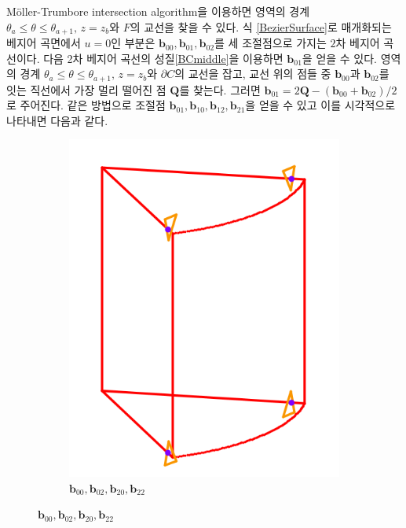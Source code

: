 \documentclass{gshs_thesis}
\theoremstyle{theorem}
\theoremstyle{lemma}
\theoremstyle{definition}
\begin{document}
Möller-Trumbore intersection algorithm을 이용하면 영역의 경계 $\theta_a \leq \theta \leq \theta_{a+1}, \, z = z_b$와 $F$의 교선을 찾을 수 있다. 식 \eqref{BezierSurface}로 매개화되는 베지어 곡면에서 $u = 0$인 부분은 $\mathbf{b}_{00}, \mathbf{b}_{01}, \mathbf{b}_{02}$를 세 조절점으로 가지는 $2$차 베지어 곡선이다. 다음 2차 베지어 곡선의 성질\eqref{BCmiddle}을 이용하면 $\mathbf{b}_{01}$을 얻을 수 있다. 영역의 경계 $\theta_a \leq \theta \leq \theta_{a+1}, \, z = z_b$와 $\partial C$의 교선을 잡고, 교선 위의 점들 중 $\mathbf{b}_{00}$과 $\mathbf{b}_{02}$를 잇는 직선에서 가장 멀리 떨어진 점 $\mathbf{Q}$를 찾는다. 그러면 $\mathbf{b}_{01} = 2\mathbf{Q} - (\mathbf{b}_{00} + \mathbf{b}_{02})/2$로 주어진다. 같은 방법으로 조절점 $\mathbf{b}_{01}, \mathbf{b}_{10}, \mathbf{b}_{12}, \mathbf{b}_{21}$을 얻을 수 있고 이를 시각적으로 나타내면 다음과 같다. 
\begin{figure}[h]
	\begin{center}
		\begin{subfigure}{.35\textwidth}
			\includegraphics[width=\textwidth]{image/approx1}
			\caption{$\mathbf{b}_{00}, \mathbf{b}_{02}, \mathbf{b}_{20}, \mathbf{b}_{22}$}

\end{subfigure}
\end{center}
\end{figure}
\end{document}
